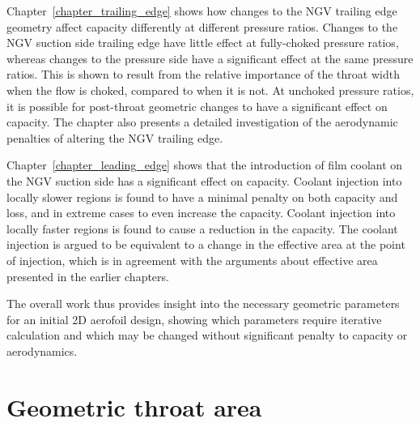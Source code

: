 \documentclass[a4paper, 11pt, oneside]{report}
\begin{document}
Chapter~\ref{chapter_trailing_edge} shows how changes to the NGV trailing edge geometry affect capacity differently at different pressure ratios. Changes to the NGV suction side trailing edge have little effect at fully-choked pressure ratios, whereas changes to the pressure side have a significant effect at the same pressure ratios. This is shown to result from the relative importance of the throat width when the flow is choked, compared to when it is not. At unchoked pressure ratios, it is possible for post-throat geometric changes to have a significant effect on capacity. The chapter also presents a detailed investigation of the aerodynamic penalties of altering the NGV trailing edge.

Chapter~\ref{chapter_leading_edge} shows that the introduction of film coolant on the NGV suction side has a significant effect on capacity. Coolant injection into locally slower regions is found to have a minimal penalty on both capacity and loss, and in extreme cases to even increase the capacity. Coolant injection into locally faster regions is found to cause a reduction in the capacity. The coolant injection is argued to be equivalent to a change in the effective area at the point of injection, which is in agreement with the arguments about effective area presented in the earlier chapters.

The overall work thus provides insight into the necessary geometric parameters for an initial 2D aerofoil design, showing which parameters require iterative calculation and which may be changed without significant penalty to capacity or aerodynamics.



\chapter{Geometric throat area}
\label{chapter_geometric_throat_area}


\end{document}
